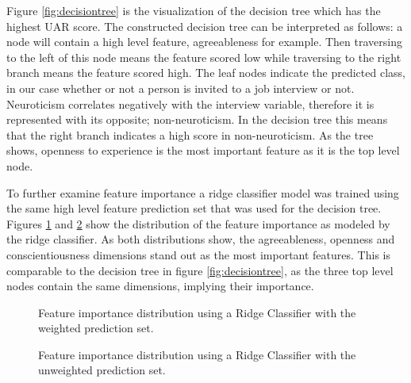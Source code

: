 Figure \ref{fig:decisiontree} is the visualization of the decision tree which has the highest UAR score. The constructed decision tree can be interpreted as follows: a node will contain a high level feature, agreeableness for example. Then traversing to the left of this node means the feature scored low while traversing to the right branch means the feature scored high. The leaf nodes indicate the predicted class, in our case whether or not a person is invited to a job interview or not. Neuroticism correlates negatively with the interview variable, therefore it is represented with its opposite; non-neuroticism. In the decision tree this means that the right branch indicates a high score in non-neuroticism. As the tree shows, openness to experience is the most important feature as it is the top level node. 

\begin{figure*}[h]
  \centering
  
  \caption{Decision Tree of the personality traits, arousal and valence dimensions, predicting the interview invitation variable.}
  \label{fig:decisiontree}
\end{figure*}

To further examine feature importance a ridge classifier model was trained using the same high level feature prediction set that was used for the decision tree. Figures \ref{fig:featureimp_weighted} and \ref{fig:featureimp_unweighted} show the distribution of the feature importance as modeled by the ridge classifier. As both distributions show, the agreeableness, openness and conscientiousness dimensions stand out as the most important features. This is comparable to the decision tree in figure \ref{fig:decisiontree}, as the three top level nodes contain the same dimensions, implying their importance.  

\begin{figure}[h]
  \centering
  
  \caption{Feature importance distribution using a Ridge Classifier with the weighted prediction set.}
  \label{fig:featureimp_weighted}
\end{figure}

\begin{figure}[h]
  \centering
  
  \caption{Feature importance distribution using a Ridge Classifier with the unweighted prediction set.}
  \label{fig:featureimp_unweighted}
\end{figure}

